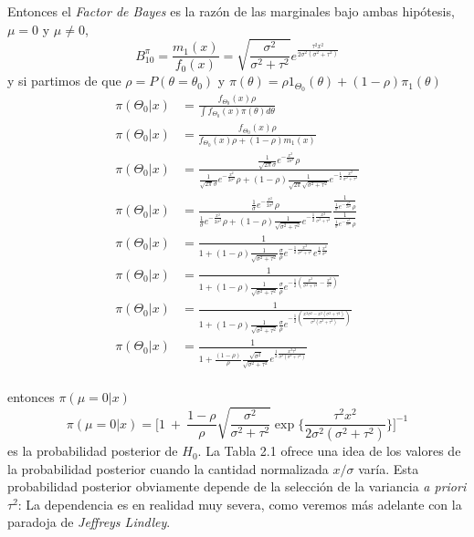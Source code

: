\documentclass[12pt,]{article}
\begin{document}
Entonces el \emph{Factor de Bayes} es la razón de las marginales bajo
ambas hipótesis, \(\mu=0\) y \(\mu\ne 0\), \[
B_{10}^\pi=\frac{m_1(x)}{f_0(x)}=\sqrt{\frac{\sigma^2}{\sigma^2+\tau^2}}e^{\frac{\tau^2x^2}{2\sigma^2(\sigma^2+\tau^2)}}
\] y si partimos de que \(\rho=P(\theta=\theta_0)\) y
\(\pi(\theta)=\rho 1_{\Theta_0}(\theta)+(1-\rho)\pi_1(\theta)\) \[
\begin{array}{rl}
\pi(\Theta_0|x) & =\frac{f_{\Theta_0}(x)\rho}{\int f_{\Theta_0}(x)\pi(\theta)d\theta}\\
\pi(\Theta_0|x) & =\frac{f_{\Theta_0}(x)\rho}{f_{\Theta_0}(x)\rho+(1-\rho)m_1(x)}\\
\pi(\Theta_0|x) & =\frac{\frac{1}{\sqrt{2\pi}\sigma}e^{-\frac{x^2}{2\sigma^2} }\rho}{\frac{1}{\sqrt{2\pi}\sigma}e^{-\frac{x^2}{2\sigma^2} }\rho+(1-\rho)\frac{1}{\sqrt{2\pi}\sqrt{\sigma^2+\tau^2}}e^{ -\frac{1}{2}\frac{x^2}{\sigma^2+\tau^2}}}\\
\pi(\Theta_0|x) & =\frac{\frac{1}{\sigma}e^{-\frac{x^2}{2\sigma^2} }\rho}{\frac{1}{\sigma}e^{-\frac{x^2}{2\sigma^2} }\rho+(1-\rho)\frac{1}{\sqrt{\sigma^2+\tau^2}}e^{ -\frac{1}{2}\frac{x^2}{\sigma^2+\tau^2}}} \frac{\frac{1}{\frac{1}{\sigma}e^{-\frac{x^2}{2\sigma^2} }\rho}}{\frac{1}{\frac{1}{\sigma}e^{-\frac{x^2}{2\sigma^2} }\rho}}\\
\pi(\Theta_0|x) & =\frac{1}{1+(1-\rho)\frac{1}{\sqrt{\sigma^2+\tau^2}}\frac{\sigma}{\rho} e^{ -\frac{1}{2}\frac{x^2}{\sigma^2+\tau^2}}e^{\frac{1}{2}\frac{x^2}{\sigma^2}}}\\
\pi(\Theta_0|x) & =\frac{1}{1+(1-\rho)\frac{1}{\sqrt{\sigma^2+\tau^2}}\frac{\sigma}{\rho} e^{ -\frac{1}{2}\left(\frac{x^2}{\sigma^2+\tau^2}-\frac{x^2}{\sigma^2}\right)}}\\
\pi(\Theta_0|x) & =\frac{1}{1+(1-\rho)\frac{1}{\sqrt{\sigma^2+\tau^2}}\frac{\sigma}{\rho} e^{ -\frac{1}{2}\left(\frac{x^2\sigma^2-x^2(\sigma^2+\tau^2)}{\sigma^2(\sigma^2+\tau^2)}\right)}}\\
\pi(\Theta_0|x) & =\frac{1}{1+\frac{(1-\rho)}{\rho}\frac{\sqrt{\sigma^2}}{\sqrt{\sigma^2+\tau^2}} e^{ \frac{1}{2}\frac{x^2\tau^2}{\sigma^2(\sigma^2+\tau^2)}}}\\
\end{array}
\]

entonces \(\pi(\mu=0|x)\) \[
\pi(\mu=0|x)=\bigg[1\ +\ \frac{1-\rho}{\rho} \displaystyle \sqrt{\frac{\sigma^2}{\sigma^2+\tau^2}}\exp\bigg\{\frac{\tau^2x^2}{2\sigma^2(\sigma^2+\tau^2)} \bigg\}\bigg]^{-1}
\] es la probabilidad posterior de \(H_0\). La Tabla 2.1 ofrece una idea
de los valores de la probabilidad posterior cuando la cantidad
normalizada \(x/\sigma\) varía. Esta probabilidad posterior obviamente
depende de la selección de la variancia \emph{a priori} \(\tau^2\): La
dependencia es en realidad muy severa, como veremos más adelante con la
paradoja de \emph{Jeffreys Lindley}.
\end{document}
